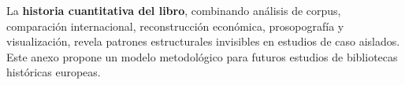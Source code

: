 \documentclass[11pt,a4paper]{article}
\begin{document}
La \textbf{historia cuantitativa del libro}, combinando análisis de corpus, comparación internacional, reconstrucción económica, prosopografía y visualización, revela patrones estructurales invisibles en estudios de caso aislados. Este anexo propone un modelo metodológico para futuros estudios de bibliotecas históricas europeas.
\end{document}
